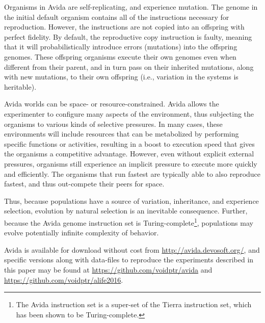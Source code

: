 \documentclass[letterpaper]{article}
\begin{document}
Organisms in Avida are self-replicating, and experience mutation. The genome in the initial default organism contains all of the instructions necessary for reproduction. However, the instructions are not copied into an offspring with perfect fidelity. By default, the reproductive copy instruction is faulty, meaning that it will probabilistically introduce errors (mutations) into the offspring genomes. These offspring organisms execute their own genomes even when different from their parent, and in turn pass on their inherited mutations, along with new mutations, to their own offspring (i.e., variation in the systems is heritable).

Avida worlds can be space- or resource-constrained. Avida allows the experimenter to configure many aspects of the environment, thus subjecting the organisms to various kinds of selective pressures.  In many cases, these environments will include resources that can be metabolized by performing specific functions or activities, resulting in a boost to execution speed that gives the organisms a competitive advantage. However, even without explicit external pressures, organisms still experience an implicit pressure to execute more quickly and efficiently. The organisms that run fastest are typically able to also reproduce fastest, and thus out-compete their peers for space.

Thus, because populations have a source of variation, inheritance, and experience selection, evolution by natural selection is an inevitable consequence. Further, because the Avida genome instruction set is Turing-complete\footnote{The Avida instruction set is a super-set of the Tierra instruction set, which has been shown to be Turing-complete\citep{maley_computational_1994}.}, populations may evolve potentially infinite complexity of behavior\citep{ofria_design_2002}. 

Avida is available for download without cost from \url{http://avida.devosoft.org/}, and specific versions along with data-files to reproduce the experiments described in this paper may be found at \url{https://github.com/voidptr/avida} and \url{https://github.com/voidptr/alife2016}.
\end{document}
